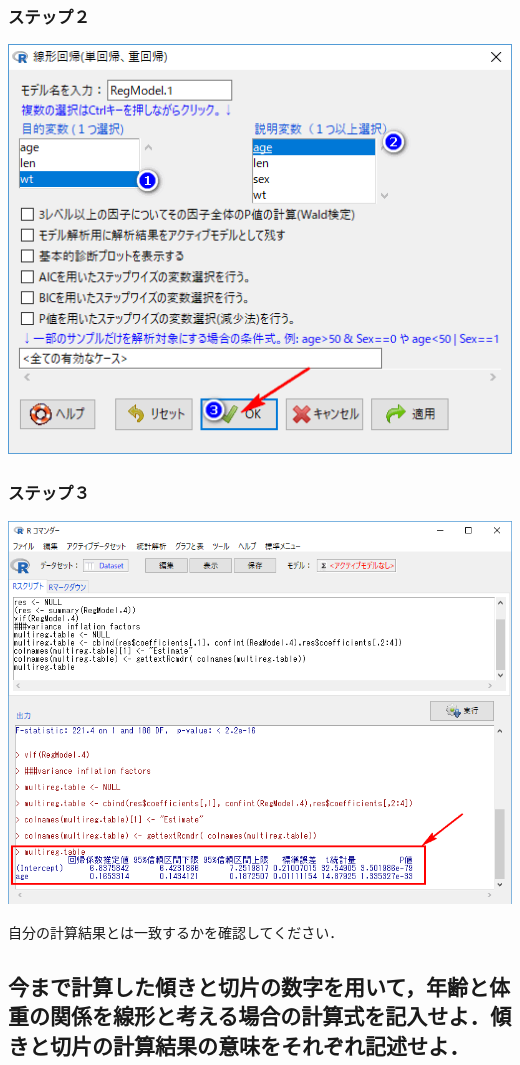 \documentclass[11pt,]{problemset}
\begin{document}
\hypertarget{-6}{%
\subsubsection{ステップ２}\label{-6}}

\begin{center}\includegraphics[width=0.6\linewidth]{pic/lm01} \end{center}

\hypertarget{-7}{%
\subsubsection{ステップ３}\label{-7}}

\begin{center}\includegraphics[width=0.8\linewidth]{pic/lm02} \end{center}

自分の計算結果とは一致するかを確認してください．

\subsection{今まで計算した傾きと切片の数字を用いて，年齢と体重の関係を線形と考える場合の計算式を記入せよ．傾きと切片の計算結果の意味をそれぞれ記述せよ．}
\end{document}
